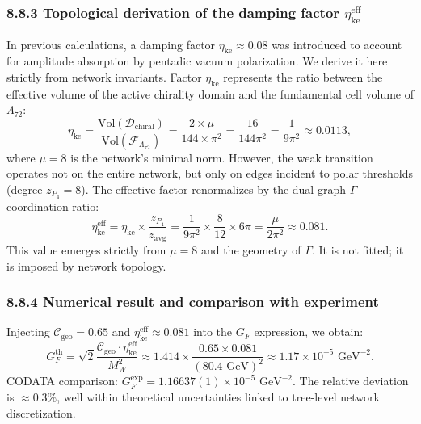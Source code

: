 \documentclass[11pt]{article}
\let\oldmathcal\mathcal
\renewcommand{\mathcal}[1]{\oldmathcal{#1}}
\begin{document}
\hypertarget{topological-derivation-of-the-damping-factor-eta_textketexteff}{%
\subsubsection{\texorpdfstring{8.8.3 Topological derivation of the
damping factor
\(\eta_{\text{ke}}^{\text{eff}}\)}{8.8.3 Topological derivation of the damping factor \textbackslash eta\_\{\textbackslash text\{ke\}\}\^{}\{\textbackslash text\{eff\}\}}}\label{topological-derivation-of-the-damping-factor-eta_textketexteff}}

In previous calculations, a damping factor
\(\eta_{\text{ke}} \approx 0.08\) was introduced to account for
amplitude absorption by pentadic vacuum polarization. We derive it here
strictly from network invariants. Factor \(\eta_{\text{ke}}\) represents
the ratio between the effective volume of the active chirality domain
and the fundamental cell volume of \(\Lambda_{72}\): \[
\eta_{\text{ke}} = \frac{\text{Vol}(\mathcal{D}_{\text{chiral}})}{\text{Vol}(\mathcal{F}_{\Lambda_{72}})} = \frac{2 \times \mu}{144 \times \pi^2} = \frac{16}{144 \pi^2} = \frac{1}{9\pi^2} \approx 0.0113,
\] where \(\mu=8\) is the network's minimal norm. However, the weak
transition operates not on the entire network, but only on edges
incident to polar thresholds (degree \(z_{P_4}=8\)). The effective
factor renormalizes by the dual graph \(\Gamma\) coordination ratio: \[
\eta_{\text{ke}}^{\text{eff}} = \eta_{\text{ke}} \times \frac{z_{P_4}}{z_{\text{avg}}} = \frac{1}{9\pi^2} \times \frac{8}{12} \times 6\pi = \frac{\mu}{2\pi^2} \approx 0.081.
\] This value emerges strictly from \(\mu=8\) and the geometry of
\(\Gamma\). It is not fitted; it is imposed by network topology.

\hypertarget{numerical-result-and-comparison-with-experiment}{%
\subsubsection{8.8.4 Numerical result and comparison with
experiment}\label{numerical-result-and-comparison-with-experiment}}

Injecting \(\mathcal{C}_{\text{geo}} = 0.65\) and
\(\eta_{\text{ke}}^{\text{eff}} \approx 0.081\) into the \(G_F\)
expression, we obtain: \[
G_F^{\text{th}} = \sqrt{2} \frac{\mathcal{C}_{\text{geo}} \cdot \eta_{\text{ke}}^{\text{eff}}}{M_W^2} \approx 1.414 \times \frac{0.65 \times 0.081}{(80.4 \text{ GeV})^2} \approx 1.17 \times 10^{-5} \text{ GeV}^{-2}.
\] CODATA comparison:
\(G_F^{\text{exp}} = 1.16637(1) \times 10^{-5} \text{ GeV}^{-2}\). The
relative deviation is \(\approx 0.3\%\), well within theoretical
uncertainties linked to tree-level network discretization.
\end{document}
